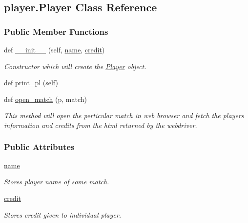 \hypertarget{classplayer_1_1Player}{}\subsection{player.\+Player Class Reference}
\label{classplayer_1_1Player}
\subsubsection*{Public Member Functions}
\begin{DoxyCompactItemize}
\item 
def \hyperlink{classplayer_1_1Player_a90d9d8f3076787182432ea5e311267cb}{\+\_\+\+\_\+init\+\_\+\+\_\+} (self, \hyperlink{classplayer_1_1Player_ab2daaa8e6d26dd7174af789d9f3cab8d}{name}, \hyperlink{classplayer_1_1Player_a605eba470b33f493297f7e0aa15d6ab9}{credit})
\begin{DoxyCompactList}\small\item\em Constructor which will create the \hyperlink{classplayer_1_1Player}{Player} object. \end{DoxyCompactList}\item 
def \hyperlink{classplayer_1_1Player_a8b277fba24c5895f6db4340be1506e19}{print\+\_\+pl} (self)
\item 
def \hyperlink{classplayer_1_1Player_a1a0c66d49918caf21f07f2d69fe37868}{open\+\_\+match} (p, match)
\begin{DoxyCompactList}\small\item\em This method will open the perticular match in web browser and fetch the players information and credits from the html returned by the webdriver. \end{DoxyCompactList}\end{DoxyCompactItemize}
\subsubsection*{Public Attributes}
\begin{DoxyCompactItemize}
\item 
\hyperlink{classplayer_1_1Player_ab2daaa8e6d26dd7174af789d9f3cab8d}{name}
\begin{DoxyCompactList}\small\item\em Stores player name of some match. \end{DoxyCompactList}\item 
\hyperlink{classplayer_1_1Player_a605eba470b33f493297f7e0aa15d6ab9}{credit}
\begin{DoxyCompactList}\small\item\em Stores credit given to individual player. \end{DoxyCompactList}\end{DoxyCompactItemize}


